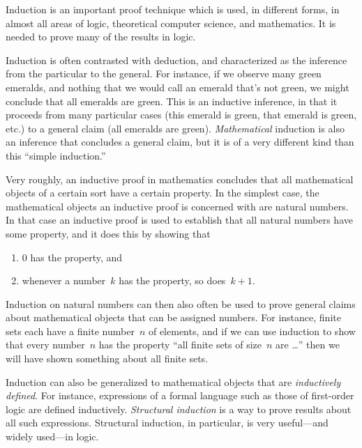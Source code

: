\documentclass[../../../include/open-logic-section]{subfiles}
\begin{document}


Induction is an important proof technique which is used, in different
forms, in almost all areas of logic, theoretical computer science, and
mathematics.  It is needed to prove many of the results in logic.

Induction is often contrasted with deduction, and characterized as the
inference from the particular to the general.  For instance, if we
observe many green emeralds, and nothing that we would call an emerald
that's not green, we might conclude that all emeralds are green. This
is an inductive inference, in that it proceeds from many particular
cases (this emerald is green, that emerald is green, etc.) to a
general claim (all emeralds are green).  \emph{Mathematical} induction
is also an inference that concludes a general claim, but it is of a
very different kind than this ``simple induction.''

Very roughly, an inductive proof in mathematics concludes that all
mathematical objects of a certain sort have a certain property.  In
the simplest case, the mathematical objects an inductive proof is
concerned with are natural numbers.  In that case an inductive proof
is used to establish that all natural numbers have some property, and
it does this by showing that
\begin{enumerate}
    \item $0$ has the property, and
    \item whenever a number~$k$ has the property, so does~$k+1$.
\end{enumerate}
Induction on natural numbers can then also often be used to prove
general claims about mathematical objects that can be assigned numbers. For
instance, finite sets each have a finite number~$n$ of elements, and
if we can use induction to show that every number~$n$ has the property
``all finite sets of size~$n$ are \dots'' then we will have shown
something about all finite sets.

Induction can also be generalized to mathematical objects that are
\emph{inductively defined}.  For instance, expressions of a formal
language such as those of first-order logic are defined inductively.
\emph{Structural induction} is a way to prove results about all such
expressions.  Structural induction, in particular, is very
useful---and widely used---in logic.
\end{document}
